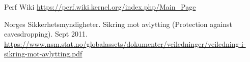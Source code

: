 \renewcommand*{\bibname}{References}



\begin{thebibliography}{18}




 Perf Wiki
\url{https://perf.wiki.kernel.org/index.php/Main_Page}



 Norges Sikkerhetsmyndigheter. Sikring mot avlytting (Protection against eavesdropping). Sept 2011. 
\url{https://www.nsm.stat.no/globalassets/dokumenter/veiledninger/veiledning-i-sikring-mot-avlytting.pdf}

\end{thebibliography}